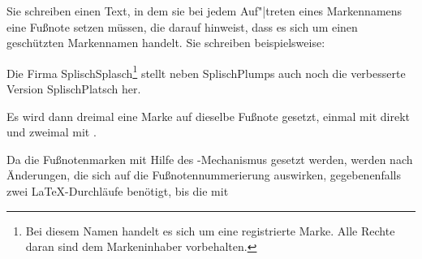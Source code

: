   \begin{Example}
    Sie schreiben einen Text, in dem sie bei jedem Auf"|treten eines
    Markennamens eine Fußnote setzen müssen, die darauf hinweist, dass es sich
    um einen geschützten Markennamen handelt. Sie schreiben beispielsweise:%
    \IfThisCommonLabelBase{maincls}{\iftrue}{\csname iffalse\endcsname}%
\begin{lstcode}
  Die Firma SplischSplasch\footnote{Bei diesem 
    Namen handelt es sich um eine registrierte
    Marke. Alle Rechte daran sind dem 
    Markeninhaber vorbehalten.\label{refnote}}
  stellt neben SplischPlumps
  auch noch die verbesserte Version 
  SplischPlatsch her.
\end{lstcode}
      Es wird dann dreimal eine Marke auf dieselbe Fußnote gesetzt, einmal mit
       direkt und zweimal mit
      .
    \else\iftrue
\begin{lstcode}
  Die Firma SplischSplasch\footnote{Bei diesem 
    Namen handelt es sich um eine registrierte
    Marke. Alle Rechte daran sind dem 
    Markeninhaber vorbehalten.\label{refnote}}
  stellt neben SplischPlumps\footref{refnote}
  auch noch die verbesserte Version 
  SplischPlatsch\footref{refnote} her.
\end{lstcode}
        Es wird dann dreimal eine Marke auf dieselbe Fußnote gesetzt, einmal
        mit \DescRef{\ThisCommonLabelBase.cmd.footnote} direkt und zweimal mit
        \Macro{footref}.
      \else
\begin{lstcode}
  Die Firma SplischSplasch\footnote{Bei diesem
    Namen handelt es sich um eine registrierte
    Marke. Alle Rechte daran sind dem 
    Markeninhaber, der Firma SplischSplasch,
    vorbehalten.\label{refnote}}
  stellt neben SplischPlumps\footref{refnote}
  auch noch die verbesserte Version 
  SplischPlatsch\footref{refnote} und das sehr
  beliebte 
  SplischSplaschPlumps\footref{refnote} her.
\end{lstcode}
        Es wird dann vier Mal eine Marke auf dieselbe Fußnote gesetzt, einmal
        mit \DescRef{\ThisCommonLabelBase.cmd.footnote} direkt und drei Mal
        mit \Macro{footref}.
      \fi%
    \fi
  \end{Example}
\fi
Da die Fußnotenmarken mit Hilfe des -Mechanismus gesetzt werden,
werden nach Änderungen, die sich auf die Fußnotennummerierung auswirken,
gegebenenfalls zwei \LaTeX-Durchläufe benötigt, bis die mit 

